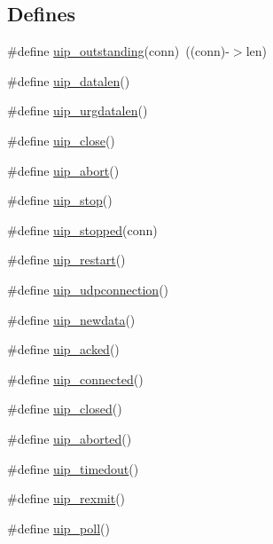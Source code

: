 \subsection*{Defines}
\begin{DoxyCompactItemize}
\item 
\#define \hyperlink{group__uipappfunc_gaef14e83c046e19ab9fe9d1bbcca276c2}{uip\_\-outstanding}(conn)~((conn)-\/$>$len)
\item 
\#define \hyperlink{group__uipappfunc_ga1a1bc437c09ddef238abab41d77c3177}{uip\_\-datalen}()
\item 
\#define \hyperlink{group__uipappfunc_ga8411c95a4d89367ad2d9d6bde1a3d537}{uip\_\-urgdatalen}()
\item 
\#define \hyperlink{group__uipappfunc_ga61db1dcb7c760e4dd5d60bf4e5576dca}{uip\_\-close}()
\item 
\#define \hyperlink{group__uipappfunc_ga88d2ccf7cd821f89d9a8df7e3948b56c}{uip\_\-abort}()
\item 
\#define \hyperlink{group__uipappfunc_ga0a8bb9d6d0f1f56852ccfccbbad6c5d8}{uip\_\-stop}()
\item 
\#define \hyperlink{group__uipappfunc_ga64a238a5c02640a7a4aef004163aeb47}{uip\_\-stopped}(conn)
\item 
\#define \hyperlink{group__uipappfunc_ga81ac47cee1c18f6aa479044069db7ca3}{uip\_\-restart}()
\item 
\#define \hyperlink{group__uipappfunc_gaa9de254b8aa308eb4aab17efdde622d2}{uip\_\-udpconnection}()
\item 
\#define \hyperlink{group__uipappfunc_ga26a14b8dae3f861830af9e7cf1e03725}{uip\_\-newdata}()
\item 
\#define \hyperlink{group__uipappfunc_gade6634974418e3240c212b9b16864368}{uip\_\-acked}()
\item 
\#define \hyperlink{group__uipappfunc_gadb971fb1525d0c5002f52125b05f3218}{uip\_\-connected}()
\item 
\#define \hyperlink{group__uipappfunc_gaef6c4140c632b6a406779342cf3b6eb6}{uip\_\-closed}()
\item 
\#define \hyperlink{group__uipappfunc_gafbd5fc486dfdf6bf6fc9db52b1f418c4}{uip\_\-aborted}()
\item 
\#define \hyperlink{group__uipappfunc_ga7b2ac4b18bd2ac3912fe67b3b17158c3}{uip\_\-timedout}()
\item 
\#define \hyperlink{group__uipappfunc_gaa8933ad15a2e2947dae4a5cff50e6007}{uip\_\-rexmit}()
\item 
\#define \hyperlink{group__uipappfunc_ga58bb90796c1cdad3aac2ecf44d87b20e}{uip\_\-poll}()

\end{DoxyCompactItemize}
